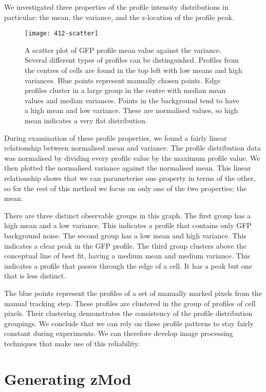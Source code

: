 We investigated three properties of the profile intensity distributions in particular: the mean, the variance, and the z-location of the profile peak.

\begin{figure}[htbp!]
\centering
\texttt{[image: 412-scatter]}
\caption[GFP profile types scatter plot]{A scatter plot of GFP profile mean value against the variance. Several different types of profiles can be distinguished. Profiles from the centres of cells are found in the top left with low means and high variances. Blue points represent manually chosen points. Edge profiles cluster in a large group in the centre with median mean values and median variances. Points in the background tend to have a high mean and low variance. These are normalised values, so high mean indicates a very flat distribution.}
\label{fig:gfp_profile_scatter}
\end{figure}

During examination of these profile properties, we found a fairly linear relationship between normalised mean and variance. The profile distribution data was normalised by dividing every profile value by the maximum profile value. We then plotted the normalised variance against the normalised mean. This linear relationship shows that we can parameterise one property in terms of the other, so for the rest of this method we focus on only one of the two properties; the mean.

There are three distinct observable groups in this graph. The first group has a high mean and a low variance. This indicates a profile that contains only GFP background noise. The second group has a low mean and high variance. This indicates a clear peak in the GFP profile. The third group clusters above the conceptual line of best fit, having a medium mean and medium variance. This indicates a profile that passes through the edge of a cell. It has a peak but one that is less distinct.

The blue points represent the profiles of a set of manually marked pixels from the manual tracking step. These profiles are clustered in the group of profiles of cell pixels. Their clustering demonstrates the consistency of the profile distribution groupings. We conclude that we can rely on these profile patterns to stay fairly constant during experiments. We can therefore develop image processing techniques that make use of this reliability.

\section{Generating zMod}

